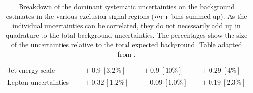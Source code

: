 \begin{table}
\begin{center}
{\begin{tabular*}{\textwidth}{lccc}
Jet energy scale         & $~~~\pm 0.9\ [3.2\%] $          & $~\pm 0.9\ [10\%] $          & $~\pm 0.29\ [4\%] $       \\
Lepton uncertainties         & $~~~~~\pm 0.32\ [1.2\%] $          & $~~~~\pm 0.09\ [1.0\%] $          & $~~~~\pm 0.19\ [2.3\%] $   \\
\bottomrule
\end{tabular*}}
\end{center}
\caption[Breakdown of uncertainties on background estimates]{
Breakdown of the dominant systematic uncertainties on the background estimates in the various exclusion signal regions ($m_{\textrm{CT}}$ bins summed up).
As the individual uncertainties can be correlated, they do not necessarily add up in quadrature to 
the total background uncertainties. The percentages show the size of the uncertainties relative to the total expected background. Table adapted from \cite{SUSY-2019-08}.}
\label{tab:systematics_summary}
\end{table}




